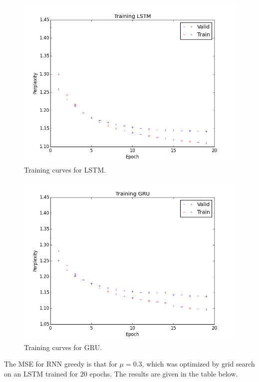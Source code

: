 \documentclass[11pt]{article}
\begin{document}
\begin{figure}[h]
\centering
\includegraphics[scale=0.5]{train_lstm}
\caption{Training curves for LSTM.}
\end{figure}

\begin{figure}[H]
\centering
\includegraphics[scale=0.5]{train_gru}
\caption{Training curves for GRU.}
\end{figure}



The MSE for RNN greedy is that for $\mu = 0.3$, which was optimized by grid search on an LSTM trained for $20$ epochs. The results are given in the table below. 
\end{document}
